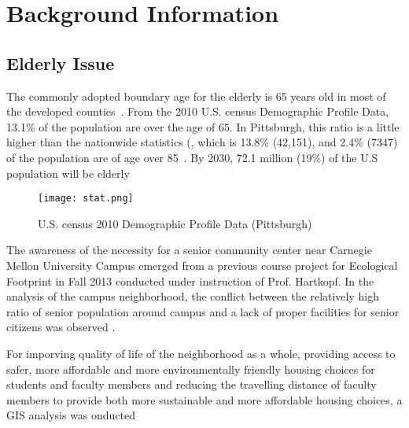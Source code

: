 
\chapter{Background Information} %

\label{Chapter1} %



\section{Elderly Issue}
The commonly adopted boundary age for the elderly is 65 years old in
most of the developed counties~\cite{WHO2015}. From the 2010
U.S. census Demographic Profile Data, 13.1\% of the population are
over the age of 65. In Pittsburgh, this ratio is a little higher than
the nationwide statistics (, which is 13.8\% (42,151),
and 2.4\% (7347) of the population are of age over
85~\cite{censusQuickFact}. By 2030, 72.1 million (19\%) of the U.S
population will be elderly ~\cite{AOA2015}~
\begin{figure}[htbp]
  \centering
  \texttt{[image: stat.png]}
  \caption[Demographic Information, Pittsburgh]{U.S. census 2010
    Demographic Profile Data (Pittsburgh)~\cite{censusQuickFact}}
  \label{fig:stat}
\end{figure}

\par The awareness of the necessity for a senior community center near
Carnegie Mellon University Campus emerged from a previous course
project for Ecological Footprint in Fall 2013 conducted under
instruction of Prof. Hartkopf. In the analysis of the campus
neighborhood, the conflict between the relatively high ratio of senior
population around campus and a lack of proper facilities for senior
citizens was observed .

For imporving quality of life of the neighborhood as a whole,
providing access to safer, more affordable and more environmentally
friendly housing choices for students and faculty members and reducing
the travelling distance of faculty members to provide both more
sustainable and more affordable housing choices, a GIS analysis was
onducted

